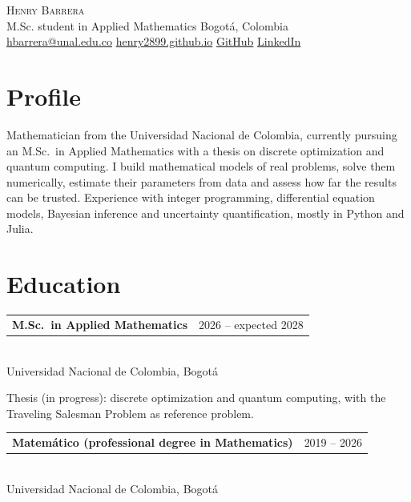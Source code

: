 \documentclass[11pt,a4paper]{article}
\makeatletter
\newcommand{\entry}[3]{%
  \begin{tabularx}{\textwidth}{@{}>{\raggedright\arraybackslash}X@{\hspace{1em}}r@{}}
    \textbf{#1} & {\color{gris}#2}
  \end{tabularx}\\
  {\color{gris}\small #3}\par\vspace{2pt}}
\makeatother
\begin{document}
\begin{center}
  {\LARGE\scshape Henry Barrera}\\[4pt]
  {\color{gris} M.Sc. student in Applied Mathematics \textperiodcentered{} Bogot\'a, Colombia}\\[3pt]
  \small
  \href{mailto:hbarrera@unal.edu.co}{hbarrera@unal.edu.co}
  \textperiodcentered{} \href{https://henry2899.github.io}{henry2899.github.io}
  \textperiodcentered{} \href{https://github.com/Henry2899}{GitHub}
  \textperiodcentered{} \href{https://www.linkedin.com/in/henry-barrera-3422981aa}{LinkedIn}
\end{center}

\section{Profile}
Mathematician from the Universidad Nacional de Colombia, currently pursuing an M.Sc.\ in Applied
Mathematics with a thesis on discrete optimization and quantum computing. I build mathematical models
of real problems, solve them numerically, estimate their parameters from data and assess how far the
results can be trusted. Experience with integer programming, differential equation models, Bayesian
inference and uncertainty quantification, mostly in Python and Julia.

\section{Education}
\entry{M.Sc.\ in Applied Mathematics}{2026 -- expected 2028}{Universidad Nacional de Colombia, Bogot\'a}
Thesis (in progress): discrete optimization and quantum computing, with the Traveling Salesman Problem
as reference problem.

\vspace{4pt}
\entry{Matem\'atico (professional degree in Mathematics)}{2019 -- 2026}{Universidad Nacional de Colombia, Bogot\'a}

\end{document}
